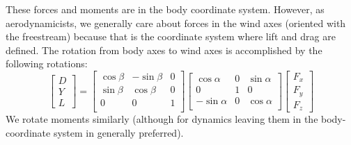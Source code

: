 \documentclass{article}
\begin{document}

These forces and moments are in the body coordinate system.  However, as aerodynamicists, we generally care about forces in the wind axes (oriented with the freestream) because that is the coordinate system where lift and drag are defined.  The rotation from body axes to wind axes is accomplished by the following rotations:
\begin{equation}
\begin{bmatrix}
D\\
Y\\
L
\end{bmatrix}
= 
\begin{bmatrix}
\cos\beta & -\sin\beta & 0 \\
\sin\beta & \cos\beta & 0 \\
0 & 0 & 1\\
\end{bmatrix}
\begin{bmatrix}
\cos\alpha & 0 & \sin\alpha \\
0 & 1 & 0\\
-\sin\alpha & 0 & \cos\alpha \\
\end{bmatrix}
\begin{bmatrix}
F_x\\
F_y\\
F_z
\end{bmatrix}
\label{eq:forceswindframe}
\end{equation}
We rotate moments similarly (although for dynamics leaving them in the body-coordinate system in generally preferred).

\end{document}
